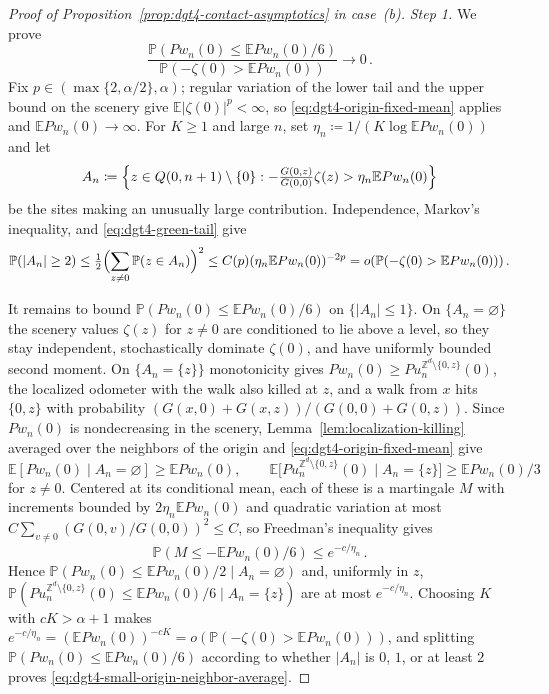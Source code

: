 \documentclass[11pt]{amsart}
\theoremstyle{plain}
\theoremstyle{definition}
\newcommand{\Z}{\mathbb{Z}}
\newcommand{\E}{\mathbb{E}}
\renewcommand{\P}{\mathbb{P}}
\begin{document}
\begin{proof}[Proof of Proposition~\ref{prop:dgt4-contact-asymptotics} in case~\textup{(b)}]
	\noindent\emph{Step 1.} We prove
	\begin{equation}\label{eq:dgt4-small-origin-neighbor-average}
		\frac{\P(Pw_n(0)\leq\E Pw_n(0)/6)}{\P(-\zeta(0)>\E Pw_n(0))}\longrightarrow0\, .
	\end{equation}
	Fix $p\in(\max\{2,\alpha/2\},\alpha)$; regular variation of the lower tail and the
	upper bound on the scenery give $\E|\zeta(0)|^p<\infty$, so
	\eqref{eq:dgt4-origin-fixed-mean} applies and $\E Pw_n(0)\to\infty$. For $K\geq1$ and
	large $n$, set $\eta_n\coloneqq1/(K\log\E Pw_n(0))$ and let
	\[
		A_n\coloneqq\Bigl\{z\in Q(0,n+1)\setminus\{0\}:-\tfrac{G(0,z)}{G(0,0)}\zeta(z)>\eta_n\E Pw_n(0)\Bigr\}
	\]
	be the sites making an unusually large contribution. Independence, Markov's
	inequality, and \eqref{eq:dgt4-green-tail} give
	\[
		\P(|A_n|\geq2)\leq\tfrac12\Bigl(\sum_{z\ne0}\P(z\in A_n)\Bigr)^2\leq C(p)(\eta_n\E Pw_n(0))^{-2p}=o(\P(-\zeta(0)>\E Pw_n(0)))\, .
	\]

	It remains to bound $\P(Pw_n(0)\leq\E Pw_n(0)/6)$ on $\{|A_n|\leq1\}$. On
	$\{A_n=\varnothing\}$ the scenery values $\zeta(z)$ for $z\ne0$ are conditioned to lie
	above a level, so they stay independent, stochastically dominate $\zeta(0)$, and have
	uniformly bounded second moment. On $\{A_n=\{z\}\}$ monotonicity gives
	$Pw_n(0)\geq Pu_n^{\Z^d\setminus\{0,z\}}(0)$, the localized odometer with the walk also
	killed at $z$, and a walk from $x$ hits $\{0,z\}$ with probability
	$(G(x,0)+G(x,z))/(G(0,0)+G(0,z))$. Since $Pw_n(0)$ is nondecreasing in the scenery,
	Lemma~\ref{lem:localization-killing} averaged over the neighbors of the origin and
	\eqref{eq:dgt4-origin-fixed-mean} give
	\[
		\E[Pw_n(0)\mid A_n=\varnothing]\geq\E Pw_n(0),\qquad
		\E\bigl[Pu_n^{\Z^d\setminus\{0,z\}}(0)\mid A_n=\{z\}\bigr]\geq\E Pw_n(0)/3
	\]
    for $z\neq 0$.
	Centered at its conditional mean, each of these is a martingale $M$ with increments
	bounded by $2\eta_n\E Pw_n(0)$ and quadratic variation at most
	$C\sum_{v\ne0}(G(0,v)/G(0,0))^2\leq C$, so Freedman's inequality gives
	\[
		\P(M\leq-\E Pw_n(0)/6)\leq e^{-c/\eta_n}\, .
	\]
	Hence $\P(Pw_n(0)\leq\E Pw_n(0)/2\mid A_n=\varnothing)$ and, uniformly in $z$,
	$\P(Pu_n^{\Z^d\setminus\{0,z\}}(0)\leq\E Pw_n(0)/6\mid A_n=\{z\})$ are at most
	$e^{-c/\eta_n}$. Choosing $K$ with $cK>\alpha+1$ makes
	$e^{-c/\eta_n}=(\E Pw_n(0))^{-cK}=o(\P(-\zeta(0)>\E Pw_n(0)))$, and splitting
	$\P(Pw_n(0)\leq\E Pw_n(0)/6)$ according to whether $|A_n|$ is $0$, $1$, or at least
	$2$ proves \eqref{eq:dgt4-small-origin-neighbor-average}.


\end{proof}
\end{document}
